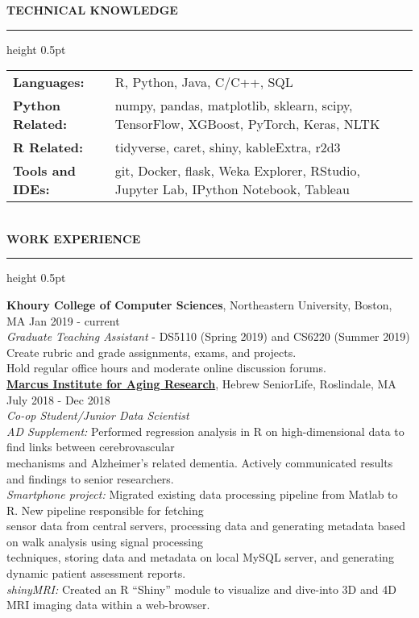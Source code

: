\documentclass[a4paper]{article}
\newcommand{\myline}{\par
  \kern2pt %
  \hrule height 0.5pt
  \kern2pt %
}
\newcommand{\mybullet}{
	\indent \textbullet \hspace*{2mm}
}
\newcommand{\linetab}{
  \\ \hspace*{9mm}
}
\begin{document}
	\noindent
	{\large \textbf{TECHNICAL KNOWLEDGE}}
	\myline 
	
	\noindent
	\begin{tabular}{ m{3cm} l }
		\textbf{Languages: } & R, Python, Java, C/C++, SQL \\ 
    \textbf{Python Related: } & numpy, pandas, matplotlib, sklearn, scipy, TensorFlow, XGBoost, PyTorch, Keras, NLTK \\ 
    \textbf{R Related: } & tidyverse, caret, shiny, kableExtra, r2d3 \\
		\textbf{Tools and IDEs: } & git, Docker, flask, Weka Explorer, RStudio, 
                Jupyter Lab, IPython Notebook, Tableau \\
	\end{tabular} \\

	\smallskip
	\smallskip
	\noindent
	{\large \textbf{WORK EXPERIENCE}}
	\myline 
	\smallskip
	
  \noindent
  \textbf{Khoury College of Computer Sciences}, Northeastern University, Boston, MA
  \hfill Jan 2019 - current \\
  \textit{Graduate Teaching Assistant} - DS5110 (Spring 2019) and CS6220 (Summer 2019) \\
  \mybullet Create rubric and grade assignments, exams, and projects. \\
  \mybullet Hold regular office hours and moderate online discussion forums. \\

  \noindent
  \textbf{\href{https://www.marcusinstituteforaging.org/}{Marcus Institute for Aging Research}}, 
  Hebrew SeniorLife, Roslindale, MA 
  \hfill July 2018 - Dec 2018 \\
        \textit{Co-op Student/Junior Data Scientist} \\
        \mybullet \textit{AD Supplement:} Performed regression analysis in R on high-dimensional 
        data to find links between cerebrovascular  \\ \hspace*{9mm} mechanisms 
        and Alzheimer's related dementia. Actively communicated results and findings to senior
        researchers. \\
        \mybullet \textit{Smartphone project:} Migrated existing data processing pipeline from 
        Matlab to R. New pipeline responsible for fetching \linetab sensor data from 
        central servers, processing data and generating metadata based on walk analysis 
        using signal processing \linetab techniques, storing data and metadata on local 
        MySQL server, and generating dynamic patient assessment reports. \\
        \mybullet \textit{shinyMRI: } Created an R ``Shiny'' module to visualize and 
        dive-into 3D and 4D MRI imaging data within a web-browser. \\
        
\end{document}
